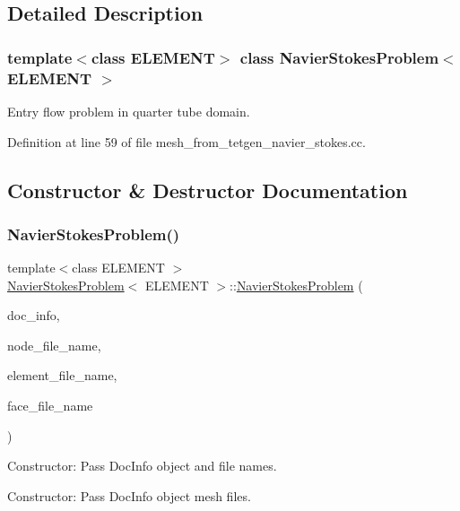 \subsection{Detailed Description}
\subsubsection*{template$<$class E\+L\+E\+M\+E\+NT$>$\newline
class Navier\+Stokes\+Problem$<$ E\+L\+E\+M\+E\+N\+T $>$}

Entry flow problem in quarter tube domain. 

Definition at line 59 of file mesh\+\_\+from\+\_\+tetgen\+\_\+navier\+\_\+stokes.\+cc.



\subsection{Constructor \& Destructor Documentation}
\mbox{\label{classNavierStokesProblem_a46835b845a017b66b7cbb45dad10bd17}} 
\subsubsection{\texorpdfstring{Navier\+Stokes\+Problem()}{NavierStokesProblem()}}
{\footnotesize\ttfamily template$<$class E\+L\+E\+M\+E\+NT $>$ \\
\hyperlink{classNavierStokesProblem}{Navier\+Stokes\+Problem}$<$ E\+L\+E\+M\+E\+NT $>$\+::\hyperlink{classNavierStokesProblem}{Navier\+Stokes\+Problem} (\begin{DoxyParamCaption}\item[{Doc\+Info \&}]{doc\+\_\+info,  }\item[{const string \&}]{node\+\_\+file\+\_\+name,  }\item[{const string \&}]{element\+\_\+file\+\_\+name,  }\item[{const string \&}]{face\+\_\+file\+\_\+name }\end{DoxyParamCaption})}



Constructor\+: Pass Doc\+Info object and file names. 

Constructor\+: Pass Doc\+Info object mesh files. 

